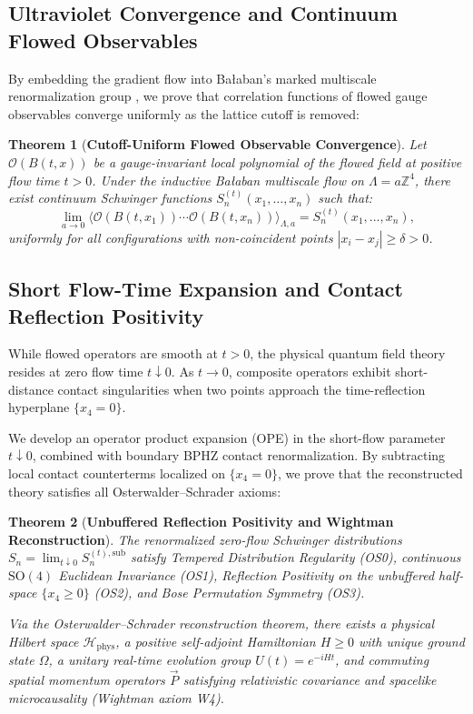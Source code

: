 \documentclass[11pt,a4paper]{article}
\newtheorem{theorem}{Theorem}[section]
\theoremstyle{definition}
\theoremstyle{remark}
\newcommand{\Z}{\mathbb{Z}}
\newcommand{\Hphys}{\mathcal{H}_{\mathrm{phys}}}
\begin{document}
\subsection{Ultraviolet Convergence and Continuum Flowed Observables}
By embedding the gradient flow into Ba{\l}aban's marked multiscale renormalization group \cite{Balaban1985CMP99,Balaban1985CMP102,Balaban1987CMP109}, we prove that correlation functions of flowed gauge observables converge uniformly as the lattice cutoff is removed:

\begin{theorem}[\textbf{Cutoff-Uniform Flowed Observable Convergence}]
Let $\mathcal{O}(B(t, x))$ be a gauge-invariant local polynomial of the flowed field at positive flow time $t > 0$. Under the inductive Ba{\l}aban multiscale flow on $\Lambda = a \Z^4$, there exist continuum Schwinger functions $S_n^{(t)}(x_1, \dots, x_n)$ such that:
\begin{equation}
\lim_{a \to 0} \langle \mathcal{O}(B(t, x_1)) \cdots \mathcal{O}(B(t, x_n)) \rangle_{\Lambda, a} = S_n^{(t)}(x_1, \dots, x_n),
\end{equation}
uniformly for all configurations with non-coincident points $|x_i - x_j| \ge \delta > 0$.
\end{theorem}

\subsection{Short Flow-Time Expansion and Contact Reflection Positivity}
While flowed operators are smooth at $t > 0$, the physical quantum field theory resides at zero flow time $t \downarrow 0$. As $t \to 0$, composite operators exhibit short-distance contact singularities when two points approach the time-reflection hyperplane $\{x_4 = 0\}$.

We develop an operator product expansion (OPE) in the short-flow parameter $t \downarrow 0$, combined with boundary BPHZ contact renormalization. By subtracting local contact counterterms localized on $\{x_4 = 0\}$, we prove that the reconstructed theory satisfies all Osterwalder--Schrader axioms:

\begin{theorem}[\textbf{Unbuffered Reflection Positivity and Wightman Reconstruction}]
The renormalized zero-flow Schwinger distributions $S_n = \lim_{t \downarrow 0} S_n^{(t), \mathrm{sub}}$ satisfy Tempered Distribution Regularity (OS0), continuous $\mathrm{SO}(4)$ Euclidean Invariance (OS1), Reflection Positivity on the unbuffered half-space $\{x_4 \ge 0\}$ (OS2), and Bose Permutation Symmetry (OS3). 

Via the Osterwalder--Schrader reconstruction theorem, there exists a physical Hilbert space $\Hphys$, a positive self-adjoint Hamiltonian $H \ge 0$ with unique ground state $\Omega$, a unitary real-time evolution group $U(t) = e^{-i H t}$, and commuting spatial momentum operators $\vec{P}$ satisfying relativistic covariance and spacelike microcausality (Wightman axiom W4).
\end{theorem}
\end{document}
